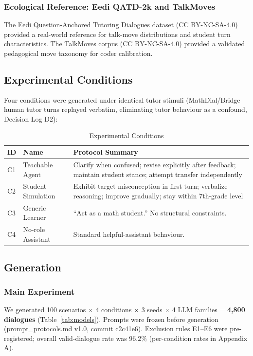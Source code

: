 \documentclass[12pt]{article}
\begin{document}
\subsubsection{Ecological Reference: Eedi QATD-2k and TalkMoves}

The Eedi Question-Anchored Tutoring Dialogues dataset \citep{eedi2025} (CC BY-NC-SA-4.0)
provided a real-world reference for talk-move distributions and student turn characteristics.
The TalkMoves corpus \citep{talkmoves2022} (CC BY-NC-SA-4.0) provided a validated
pedagogical move taxonomy for coder calibration.

\subsection{Experimental Conditions}

Four conditions were generated under identical tutor stimuli (MathDial/Bridge human tutor
turns replayed verbatim, eliminating tutor behaviour as a confound, Decision Log D2):

\begin{table}[h]
\centering
\caption{Experimental Conditions}
\begin{tabular}{llp{7.5cm}}
\toprule
ID & Name & Protocol Summary \\
\midrule
C1 & Teachable Agent & Clarify when confused; revise explicitly after feedback;
                       maintain student stance; attempt transfer independently \\
C2 & Student Simulation & Exhibit target misconception in first turn; verbalize
                          reasoning; improve gradually; stay within 7th-grade level \\
C3 & Generic Learner & ``Act as a math student.'' No structural constraints. \\
C4 & No-role Assistant & Standard helpful-assistant behaviour. \\
\bottomrule
\end{tabular}
\end{table}

\subsection{Generation}

\subsubsection{Main Experiment}

We generated 100 scenarios $\times$ 4 conditions $\times$ 3 seeds $\times$ 4 LLM families
= \textbf{4,800 dialogues} (Table~\ref{tab:models}). Prompts were frozen before generation
(prompt\_protocols.md v1.0, commit c2c41e6). Exclusion rules E1--E6 were pre-registered;
overall valid-dialogue rate was 96.2\% (per-condition rates in Appendix A).
\end{document}
